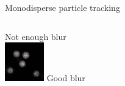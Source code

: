 \documentclass{beamer}
\begin{document}
\begin{frame}{Monodisperse particle tracking}
	\begin{columns}[T]
	\centering
	Not enough blur\\
	\includegraphics[width=\textwidth]{dillute_notblured}
	\centering
	Good blur\\
\end{columns}
\end{frame}
\end{document}
